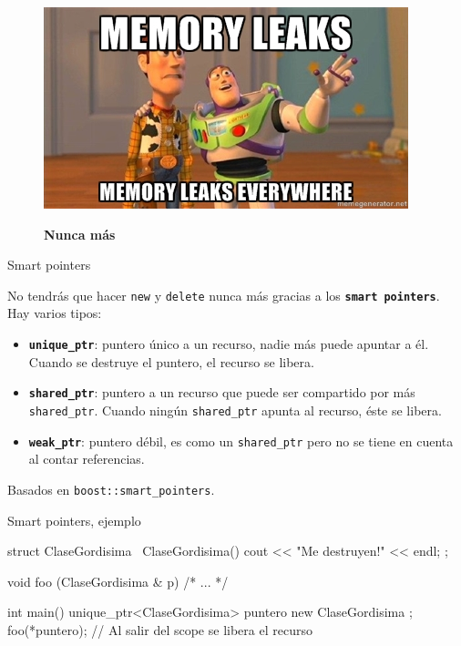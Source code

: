 \documentclass[8pt,xcolor=svgnames]{beamer}
\begin{document}
\begin{frame}

\centering

\begin{figure}[c!]
  \centering
  \includegraphics{img_memory_leaks.jpg}

  \Huge \textbf{Nunca más}
\end{figure}  
\end{frame}

\begin{frame}[fragile]{Smart pointers}

  No tendrás que hacer \texttt{new} y \texttt{delete} nunca más gracias a los
  \textbf{\texttt{smart pointers}}. \\Hay varios tipos:

  \begin{itemize}
  \item \textbf{\texttt{unique\_ptr}}: puntero único a un recurso, nadie más puede apuntar
    a él. Cuando se destruye el puntero, el recurso se libera.
  \item \textbf{\texttt{shared\_ptr}}: puntero a un recurso que puede ser
    compartido por más \texttt{shared\_ptr}. Cuando ningún \texttt{shared\_ptr}
    apunta al recurso, éste se libera.
  \item \textbf{\texttt{weak\_ptr}}: puntero débil, es como un
    \texttt{shared\_ptr} pero no se tiene en cuenta al contar referencias.
  \end{itemize}
  
Basados en \texttt{boost::smart\_pointers}.
\end{frame}

\begin{frame}[fragile]{Smart pointers, ejemplo}

  \begin{cppcode}
struct ClaseGordisima { 
    ~ClaseGordisima() { cout << "Me destruyen!" << endl; }
};

void foo (ClaseGordisima & p) { /* ... */ }

int main()
{
    unique_ptr<ClaseGordisima> puntero { new ClaseGordisima };
    foo(*puntero);
} 
// Al salir del scope se libera el recurso   
  \end{cppcode}
  
\end{frame}
\end{document}
